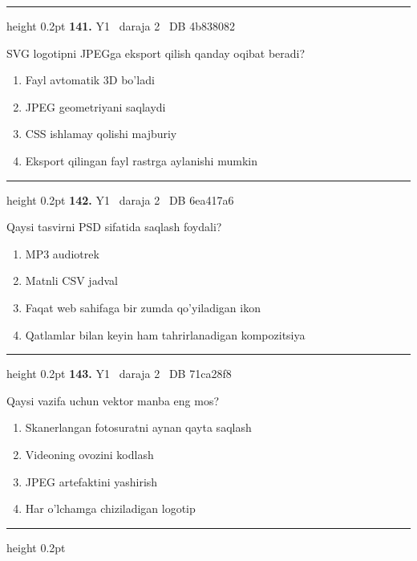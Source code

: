 \documentclass[10pt,a4paper,oneside]{article}
\begin{document}
\vspace{2mm}\hrule height 0.2pt \vspace{4mm}
\hypertarget{q141}{\textbf{\color{ink}141.}}  {\color{muted}\scriptsize Y1 \textbullet\ daraja 2 \textbullet\ DB 4b838082}
\par
SVG logotipni JPEGga eksport qilish qanday oqibat beradi?
\begin{enumerate}[label=\Alph*),leftmargin=9mm]
\item Fayl avtomatik 3D bo'ladi
\item JPEG geometriyani saqlaydi
\item CSS ishlamay qolishi majburiy
\item Eksport qilingan fayl rastrga aylanishi mumkin
\end{enumerate}
\vspace{2mm}\hrule height 0.2pt \vspace{4mm}
\hypertarget{q142}{\textbf{\color{ink}142.}}  {\color{muted}\scriptsize Y1 \textbullet\ daraja 2 \textbullet\ DB 6ea417a6}
\par
Qaysi tasvirni PSD sifatida saqlash foydali?
\begin{enumerate}[label=\Alph*),leftmargin=9mm]
\item MP3 audiotrek
\item Matnli CSV jadval
\item Faqat web sahifaga bir zumda qo'yiladigan ikon
\item Qatlamlar bilan keyin ham tahrirlanadigan kompozitsiya
\end{enumerate}
\vspace{2mm}\hrule height 0.2pt \vspace{4mm}
\hypertarget{q143}{\textbf{\color{ink}143.}}  {\color{muted}\scriptsize Y1 \textbullet\ daraja 2 \textbullet\ DB 71ca28f8}
\par
Qaysi vazifa uchun vektor manba eng mos?
\begin{enumerate}[label=\Alph*),leftmargin=9mm]
\item Skanerlangan fotosuratni aynan qayta saqlash
\item Videoning ovozini kodlash
\item JPEG artefaktini yashirish
\item Har o'lchamga chiziladigan logotip
\end{enumerate}
\vspace{2mm}\hrule height 0.2pt \vspace{4mm}
\end{document}
